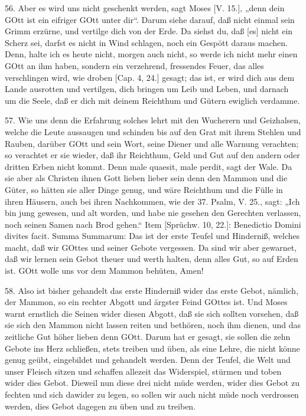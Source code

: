 56. Aber es wird uns nicht geschenkt werden, sagt Moses [V. 15.], „denn dein GOtt ist ein eifriger GOtt unter dir“. Darum siehe darauf, daß nicht einmal sein Grimm erzürne, und vertilge dich von der Erde. Da siehst du, daß [es] nicht ein Scherz sei, darfst es nicht in Wind schlagen, noch ein Gespött daraus machen. Denn, halte ich es heute nicht, morgen auch nicht, so werde ich nicht mehr einen GOtt an ihm haben, sondern ein verzehrend, fressendes Feuer, das alles verschlingen wird, wie droben [Cap. 4, 24.] gesagt; das ist, er wird dich aus dem Lande ausrotten und vertilgen, dich bringen um Leib und Leben, und darnach um die Seele, daß er dich mit deinem Reichthum und Gütern ewiglich verdamme.

57. Wie uns denn die Erfahrung solches lehrt mit den Wucherern und Geizhalsen, welche die Leute aussaugen und schinden bis auf den Grat mit ihrem Stehlen und Rauben, darüber GOtt und sein Wort, seine Diener und alle Warnung verachten; so verachtet er sie wieder, daß ihr Reichthum, Geld und Gut auf den andern oder dritten Erben nicht kommt. Denn male quaesit, male perdit, sagt der Wale. Da sie aber als Christen ihnen Gott lieben lieber sein denn den Mammon und die Güter, so hätten sie aller Dinge genug, und wäre Reichthum und die Fülle in ihren Häusern, auch bei ihren Nachkommen, wie der 37. Psalm, V. 25., sagt: „Ich bin jung gewesen, und alt worden, und habe nie gesehen den Gerechten verlassen, noch seinen Samen nach Brod gehen.“ Item [Sprüchw. 10, 22.]: Benedictio Domini divites facit. Summa Summarum: Das ist der erste Teufel und Hinderniß, welches macht, daß wir GOttes und seiner Gebote vergessen. Da sind wir aber gewarnet, daß wir lernen sein Gebot theuer und werth halten, denn alles Gut, so auf Erden ist. GOtt wolle uns vor dem Mammon behüten, Amen!

58. Also ist bisher gehandelt das erste Hinderniß wider das erste Gebot, nämlich, der Mammon, so ein rechter Abgott und ärgster Feind GOttes ist. Und Moses warnt ernstlich die Seinen wider diesen Abgott, daß sie sich sollten vorsehen, daß sie sich den Mammon nicht lassen reiten und bethören, noch ihm dienen, und das zeitliche Gut höher lieben denn GOtt. Darum hat er gesagt, sie sollen die zehn Gebote ins Herz schließen, stets treiben und üben, als eine Lehre, die nicht könne genug geübt, eingebildet und gehandelt werden. Denn der Teufel, die Welt und unser Fleisch sitzen und schaffen allezeit das Widerspiel, stürmen und toben wider dies Gebot. Dieweil nun diese drei nicht müde werden, wider dies Gebot zu fechten und sich dawider zu legen, so sollen wir auch nicht müde noch verdrossen werden, dies Gebot dagegen zu üben und zu treiben.

